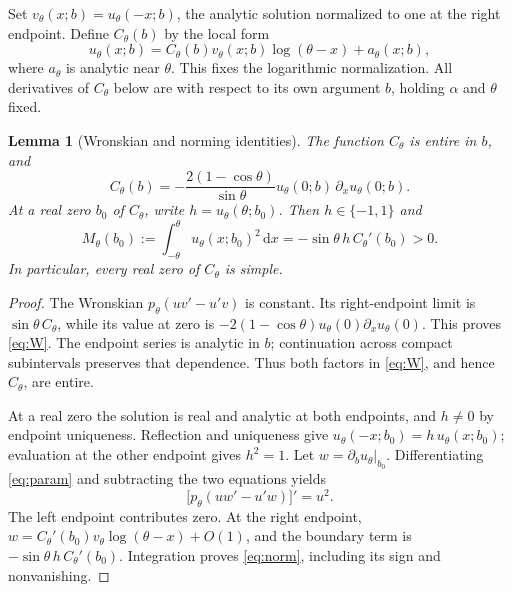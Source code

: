 \documentclass[10pt]{article}
\newtheorem{lemma}[theorem]{Lemma}
\newcommand{\dd}{\mathrm d}
\begin{document}
Set $v_\theta(x;b)=u_\theta(-x;b)$, the analytic solution normalized to one
at the right endpoint. Define $C_\theta(b)$ by the local form
\begin{equation}
u_\theta(x;b)=C_\theta(b)v_\theta(x;b)\log(\theta-x)
+a_\theta(x;b),
\label{eq:C}
\end{equation}
where $a_\theta$ is analytic near $\theta$. This fixes the logarithmic
normalization. All derivatives of $C_\theta$ below are with respect to
its own argument $b$, holding $\alpha$ and $\theta$ fixed.

\begin{lemma}[Wronskian and norming identities]
The function $C_\theta$ is entire in $b$, and
\begin{equation}
C_\theta(b)=-\frac{2(1-\cos\theta)}{\sin\theta}
u_\theta(0;b)\,\partial_xu_\theta(0;b).
\label{eq:W}
\end{equation}
At a real zero $b_0$ of $C_\theta$, write $h=u_\theta(\theta;b_0)$.
Then $h\in\{-1,1\}$ and
\begin{equation}
M_\theta(b_0):=\int_{-\theta}^{\theta}u_\theta(x;b_0)^2\,\dd x
=-\sin\theta\,h\,C_\theta'(b_0)>0.
\label{eq:norm}
\end{equation}
In particular, every real zero of $C_\theta$ is simple.
\end{lemma}
\begin{proof}
The Wronskian $p_\theta(uv'-u'v)$ is constant. Its right-endpoint limit
is $\sin\theta\,C_\theta$, while its value at zero is
$-2(1-\cos\theta)u_\theta(0)\partial_xu_\theta(0)$.
This proves \eqref{eq:W}. The endpoint series is analytic in $b$;
continuation across compact subintervals preserves that dependence.
Thus both factors in \eqref{eq:W}, and hence $C_\theta$, are entire.

At a real zero the solution is real and analytic at both endpoints,
and $h\ne0$ by endpoint uniqueness. Reflection and uniqueness give
$u_\theta(-x;b_0)=h\,u_\theta(x;b_0)$; evaluation at the other endpoint
gives $h^2=1$.
Let $w=\partial_bu_\theta|_{b_0}$.
Differentiating \eqref{eq:param} and subtracting the two equations yields
\[
\bigl[p_\theta(uw'-u'w)\bigr]'=u^2.
\]
The left endpoint contributes zero. At the right endpoint,
$w=C_\theta'(b_0)v_\theta\log(\theta-x)+O(1)$, and the boundary
term is $-\sin\theta\,h\,C_\theta'(b_0)$.
Integration proves \eqref{eq:norm}, including its sign and nonvanishing.
\end{proof}
\end{document}
